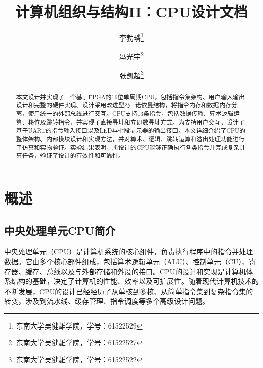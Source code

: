 \documentclass[lang=cn,a4paper,newtx]{elegantpaper}
\title{计算机组织与结构II：CPU设计文档}
\author{
  李勃璘\thanks{东南大学吴健雄学院，学号：61522529} \and
  冯光宇\thanks{东南大学吴健雄学院，学号：61522527} \and
  张凯超\thanks{东南大学吴健雄学院，学号：61522522}
}
\date{\zhdate{2025/5/8}}
\begin{document}
\maketitle
\thispagestyle{empty}
\begin{abstract}
  本文设计并实现了一个基于FPGA的16位单周期CPU，包括指令集架构、用户输入输出设计和完整的硬件实现。设计采用改进型冯·诺依曼结构，将指令内存和数据内存分离，使用统一的外部总线进行交互。CPU支持13条指令，包括数据传输、算术逻辑运算、移位及跳转指令，并实现了直接寻址和立即数寻址方式。为支持用户交互，设计了基于UART的指令输入接口以及LED与七段显示器的输出接口。本文详细介绍了CPU的整体架构、内部模块设计和实现方法，并对算术、逻辑、跳转运算和溢出处理功能进行了仿真和实物验证。实验结果表明，所设计的CPU能够正确执行各类指令并完成复杂计算任务，验证了设计的有效性和可靠性。
\end{abstract}








\newpage
{}
\tableofcontents
\newpage
\listoffigures
\newpage
\listoftables
\newpage
{}
\lstset{nolol}
\section{概述}
\subsection{中央处理单元CPU简介}
中央处理单元（CPU）是计算机系统的核心组件，负责执行程序中的指令并处理数据。它由多个核心部件组成，包括算术逻辑单元（ALU）、控制单元（CU）、寄存器、缓存、总线以及与外部存储和外设的接口。CPU的设计和实现是计算机体系结构的基础，决定了计算机的性能、效率以及可扩展性。随着现代计算机技术的不断发展，CPU的设计已经经历了从单核到多核、从简单指令集到复杂指令集的转变，涉及到流水线、缓存管理、指令调度等多个高级设计问题。
\end{document}

